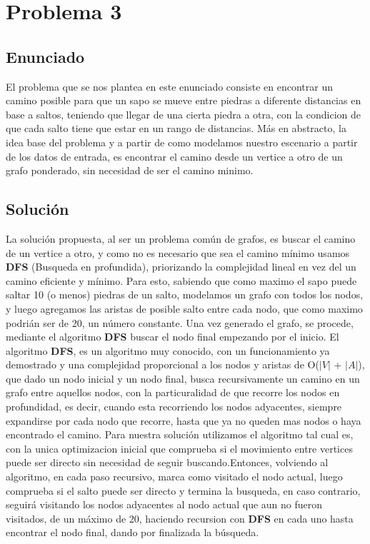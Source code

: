 \section{Problema 3}

\subsection{Enunciado}
El problema que se nos plantea en este enunciado consiste en encontrar un camino posible para que un sapo se mueve entre piedras a diferente distancias en base a saltos, teniendo que llegar de una cierta piedra a otra, con la condicion de que cada salto tiene que estar en un rango de distancias.
Más en abstracto, la idea base del problema y a partir de como modelamos nuestro escenario a partir de los datos de entrada, es encontrar el camino desde un vertice a otro de un grafo ponderado, sin necesidad de ser el camino minimo. 

\subsection{Soluci\'on}

La solución propuesta, al ser un problema común de grafos, es buscar el camino de un vertice a otro, y como no es necesario que sea el camino mínimo usamos \textbf{DFS} (Busqueda en profundida), priorizando la complejidad lineal en vez del un camino eficiente y mínimo. Para esto, sabiendo que como maximo el sapo puede saltar 10 (o menos) piedras de un salto, modelamos un grafo con todos los nodos, y luego agregamos las aristas de posible salto entre cada nodo, que como maximo podrián ser de 20, un número constante.
Una vez generado el grafo, se procede, mediante el algoritmo \textbf{DFS} buscar el nodo final empezando por el inicio. 
El algoritmo \textbf{DFS}, es un algoritmo muy conocido, con un funcionamiento ya demostrado y una complejidad proporcional a los nodos y aristas de O($|V|$ + $|A|$), que dado un nodo inicial y un nodo final, busca recursivamente un camino en un grafo entre aquellos nodos, con la particuralidad de que recorre los nodos en profundidad, es decir, cuando esta recorriendo los nodos adyacentes, siempre expandirse por cada nodo que recorre, hasta que ya no queden mas nodos o haya encontrado el camino.
Para nuestra solución utilizamos el algoritmo tal cual es, con la unica optimizacion inicial que comprueba si el movimiento entre vertices puede ser directo sin necesidad de seguir buscando.Entonces, volviendo al algoritmo, en cada paso recursivo, marca como visitado el nodo actual, luego comprueba si el salto puede ser directo y termina la busqueda, en caso contrario, seguirá visitando los nodos adyacentes al nodo actual que aun no fueron visitados, de un máximo de 20, haciendo recursion con \textbf{DFS} en cada uno hasta encontrar el nodo final, dando por finalizada la búsqueda.

